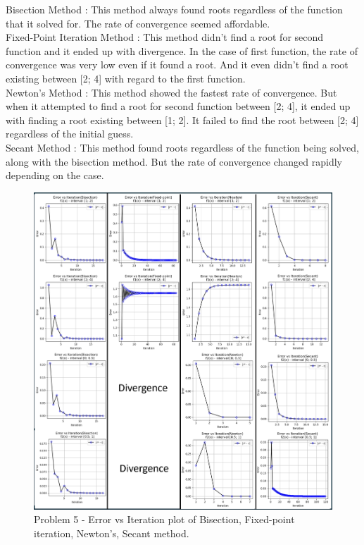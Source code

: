 \documentclass{article} %
\begin{document}
{    \noindent Bisection Method : This method always found roots regardless of the function that it solved for. The rate of convergence seemed affordable. \\

    \noindent Fixed-Point Iteration Method : This method didn't find a root for second function and it ended up with divergence.
     In the case of first function, the rate of convergence was very low even if it found a root. 
     And it even didn't find a root existing between [2; 4] with regard to the first function. \\

    \noindent Newton's Method : This method showed the fastest rate of convergence. 
    But when it attempted to find a root for second function between [2; 4], it ended up with finding a root existing between [1; 2].
    It failed to find the root between [2; 4] regardless of the initial guess. \\

    \noindent Secant Method : This method found roots regardless of the function being solved, along with the bisection method.
    But the rate of convergence changed rapidly depending on the case. \\

    \clearpage
    \begin{figure}[h!]
    \centering
    \includegraphics[width=1\textwidth]{generated_image4.png}
    \caption{Problem 5 - Error vs Iteration plot of Bisection, Fixed-point iteration, Newton's, Secant method.}
    \label{fig3}
    \end{figure}

}
\end{document}

